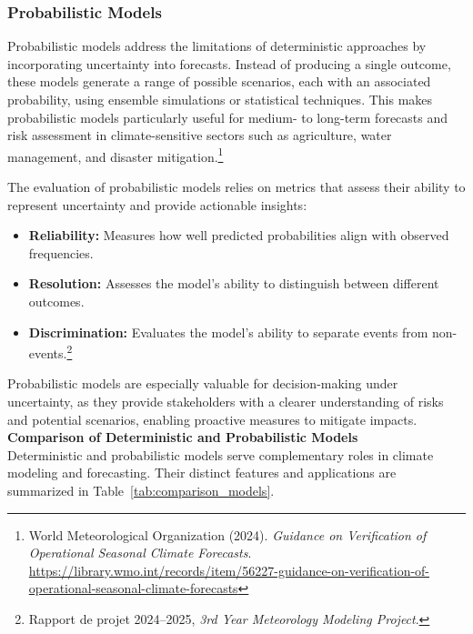\subsubsection{Probabilistic Models}
Probabilistic models address the limitations of deterministic approaches by incorporating uncertainty into forecasts. Instead of producing a single outcome, these models generate a range of possible scenarios, each with an associated probability, using ensemble simulations or statistical techniques. This makes probabilistic models particularly useful for medium- to long-term forecasts and risk assessment in climate-sensitive sectors such as agriculture, water management, and disaster mitigation.\footnote{World Meteorological Organization (2024). \textit{Guidance on Verification of Operational Seasonal Climate Forecasts}. \url{https://library.wmo.int/records/item/56227-guidance-on-verification-of-operational-seasonal-climate-forecasts}}

The evaluation of probabilistic models relies on metrics that assess their ability to represent uncertainty and provide actionable insights:
\begin{itemize}
    \item \textbf{Reliability:} Measures how well predicted probabilities align with observed frequencies.
    \item \textbf{Resolution:} Assesses the model’s ability to distinguish between different outcomes.
    \item \textbf{Discrimination:} Evaluates the model’s ability to separate events from non-events.\footnote{Rapport de projet 2024–2025, \textit{3rd Year Meteorology Modeling Project}.}
\end{itemize}

Probabilistic models are especially valuable for decision-making under uncertainty, as they provide stakeholders with a clearer understanding of risks and potential scenarios, enabling proactive measures to mitigate impacts.\\

\textbf{Comparison of Deterministic and Probabilistic Models}\\
Deterministic and probabilistic models serve complementary roles in climate modeling and forecasting. Their distinct features and applications are summarized in Table~\ref{tab:comparison_models}.


